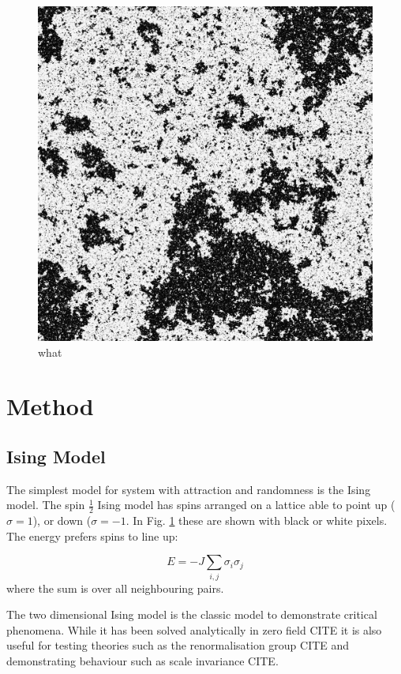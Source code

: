 \documentclass[aps,prl,reprint,groupedaddress]{revtex4-1}
\begin{document}
\begin{figure}
\includegraphics[width=\columnwidth]{data/swolff0000.png}
\caption{\label{fig-config} what}
\end{figure}

\section{Method\label{sec-method}}

\subsection{Ising Model}

The simplest model for system with attraction and randomness is the Ising model. The spin $\frac{1}{2}$ Ising model has spins arranged on a lattice able to point up ($\sigma = 1$), or down ($\sigma = -1$. In Fig. \ref{fig-config} these are shown with black or white pixels. The energy prefers spins to line up:

\begin{equation}
E = -J \sum_{i, j} \sigma_i \sigma_j
\end{equation}
where the sum is over all neighbouring pairs.

The two dimensional Ising model is the classic model to demonstrate critical phenomena. While it has been solved analytically in zero field CITE it is also useful for testing theories such as the renormalisation group CITE and demonstrating behaviour such as scale invariance CITE.
\end{document}
